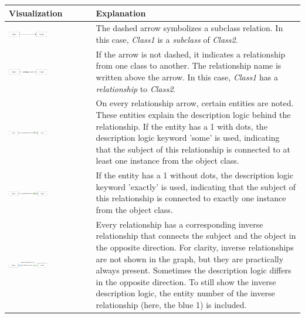 \documentclass[
  a4paper,  %
  twoside,  %
  bibliography=totoc,
  headsepline,
  cleardoublepage=empty,
  parskip=half,
  draft=false
]{scrbook}
\begin{document}
\begin{table}
\centering
\begin{tabular}{ 
  |>{\centering\arraybackslash}m{}
  |>{\raggedright\arraybackslash}m{}| 
}
\hline
\textbf{Visualization} & \textbf{Explanation} \\ \hline
\vspace{5pt}
{\includegraphics[width=0.48\textwidth]{graphics/Graph Legend/subclass.drawio.png}} & The dashed arrow symbolizes a subclass relation. In this case, \textit{Class1} is a \textit{subclass} of \textit{Class2}. \\ \hline
\vspace{5pt}
{\includegraphics[width=0.48\textwidth]{graphics/Graph Legend/relation.drawio.png}} & If the arrow is not dashed, it indicates a relationship from one class to another. The relationship name is written above the arrow. In this case, \textit{Class1} has a \textit{relationship} to \textit{Class2}. \\ \hline
\vspace{5pt}
{\includegraphics[width=0.48\textwidth]{graphics/Graph Legend/DL2.drawio.png}} & On every relationship arrow, certain entities are noted. These entities explain the description logic behind the relationship. If the entity has a 1 with dots, the description logic keyword 'some' is used, indicating that the subject of this relationship is connected to at least one instance from the object class. \\ \hline
\vspace{5pt}
{\includegraphics[width=0.48\textwidth]{graphics/Graph Legend/DL3.drawio.png}} & If the entity has a 1 without dots, the description logic keyword 'exactly' is used, indicating that the subject of this relationship is connected to exactly one instance from the object class. \\ \hline
\vspace{5pt}
{\includegraphics[width=0.48\textwidth]{graphics/Graph Legend/DL1.drawio.png}} & Every relationship has a corresponding inverse relationship that connects the subject and the object in the opposite direction. For clarity, inverse relationships are not shown in the graph, but they are practically always present. Sometimes the description logic differs in the opposite direction. To still show the inverse description logic, the entity number of the inverse relationship (here, the blue 1) is included. \\ \hline  

\end{tabular}
\end{table}
\end{document}
